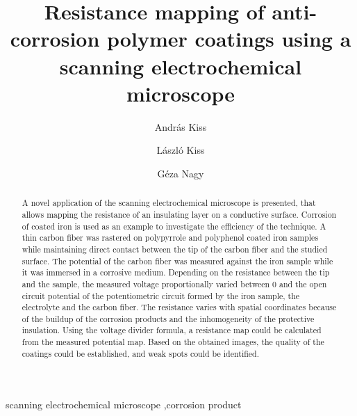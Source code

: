 \documentclass[3p]{elsarticle}
\begin{document}
\begin{frontmatter}

\title{Resistance mapping of anti-corrosion polymer coatings using a scanning electrochemical microscope}
\author[akiss]{Andr\'{a}s Kiss}
\address[akiss, gnagy]{Department of General and Physical Chemistry, Faculty of Sciences, University of P\'{e}cs, 7624 P\'{e}cs, Ifj\'{u}s\'{a}g \'{u}tja 6, Hungary}
\address[akiss, gnagy]{J\'{a}nos Szent\'{a}gothai Research Centre, University of P\'{e}cs, 7624 P\'{e}cs, Ifj\'{u}s\'{a}g \'{u}tja 20, Hungary}
\author[lkiss]{L\'{a}szl\'{o} Kiss}
\author[gnagy]{G\'{e}za Nagy}

\begin{abstract}
A novel application of the scanning electrochemical microscope is presented, that allows mapping the resistance of an insulating layer on a conductive surface. Corrosion of coated iron is used as an example to investigate the efficiency of the technique. A thin carbon fiber was rastered on polypyrrole and polyphenol coated iron samples while maintaining direct contact between the tip of the carbon fiber and the studied surface. The potential of the carbon fiber was measured against the iron sample while it was immersed in a corrosive medium. Depending on the resistance between the tip and the sample, the measured voltage proportionally varied between 0 and the open circuit potential of the potentiometric circuit formed by the iron sample, the electrolyte and the carbon fiber. The resistance varies with spatial coordinates because of the buildup of the corrosion products and the inhomogeneity of the protective insulation. Using the voltage divider formula, a resistance map could be calculated from the measured potential map. Based on the obtained images, the quality of the coatings could be established, and weak spots could be identified.
\end{abstract}

\begin{keyword}
	scanning electrochemical microscope \sep corrosion product
\end{keyword}
\end{frontmatter}
\end{document}
